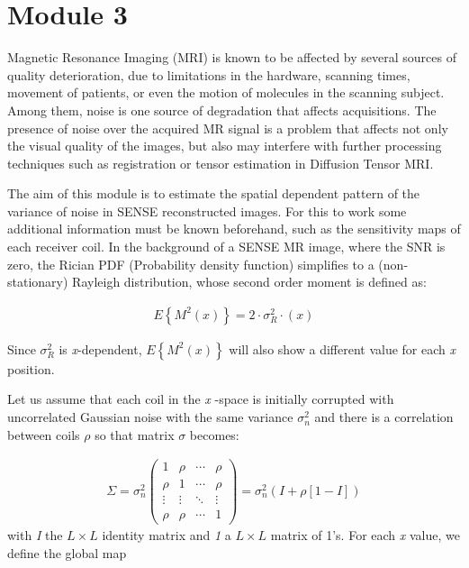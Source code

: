\section{Module 3}

Magnetic Resonance Imaging (MRI) is known to be affected by several sources of quality deterioration, due to limitations in the hardware, scanning times, movement of patients, or even the motion of molecules in the scanning subject. Among them, noise is one source of degradation that affects acquisitions. The presence of noise over the acquired MR signal is a problem that affects not only the visual quality of the images, but also may interfere with further processing techniques such as registration or tensor estimation in Diffusion Tensor MRI.

The aim of this module is to estimate the spatial dependent pattern of the variance of noise in SENSE reconstructed images. For this to work some additional information must be known beforehand, such as the sensitivity maps of each receiver coil. In the background of a SENSE MR image, where the SNR is zero, the Rician PDF (Probability density function) simplifies to a (non-stationary) Rayleigh distribution, whose second order moment is defined as:

\begin{equation}
\begin{aligned}
E\left \{ M^{2}\left ( x \right ) \right \}= 2\cdot \sigma_R^{2}\cdot \left ( x \right )
\end{aligned}
\end{equation}

Since $\sigma_R^{2}$ is \textit{x}-dependent, $E\left \{ M^{2}\left ( x \right ) \right \}$ will also show a different value for each \textit{x} position.

Let us assume that each coil in the \textit{x} -space is initially corrupted with uncorrelated Gaussian noise with the same variance $\sigma_n^{2}$ and there
is a correlation between coils $\rho$ so that matrix $\sigma$ becomes:

\begin{equation}
\begin{aligned}
\Sigma= \sigma_n^{2}\begin{pmatrix}
1 & \rho & \cdots & \rho \\ 
\rho & 1 & \cdots & \rho \\ 
\vdots & \vdots & \ddots & \vdots \\ 
\rho & \rho & \cdots & 1
\end{pmatrix}= \sigma_n^{2}\left ( I+\rho\left [ 1-I \right ] \right )
\end{aligned}
\end{equation}
with \textit{I} the $L\times L$ identity matrix and \textit{1} a $L\times L$ matrix of 1's. For each \textit{x} value, we define the global map

